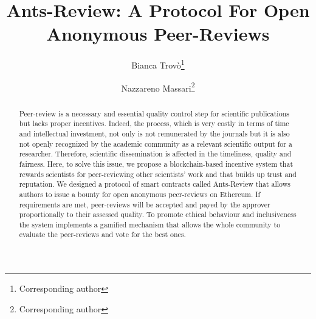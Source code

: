 \documentclass[runningheads]{llncs}
\begin{document}
%
\title{Ants-Review: A Protocol For Open Anonymous Peer-Reviews}
%
%
\author{Bianca Trovò\thanks{Corresponding author}\and
Nazzareno Massari\thanks{Corresponding author}}
%
%
%
\maketitle              %
%
\begin{abstract}
Peer-review is a necessary and essential quality control step for scientific publications but lacks proper  incentives. Indeed, the process, which is very costly in terms of time and intellectual investment, not only is not remunerated by the journals but it is also not openly recognized by the academic community as a relevant scientific output for a researcher. Therefore, scientific dissemination is affected in the timeliness, quality and fairness. Here, to solve this issue, we propose a blockchain-based incentive system that rewards scientists for peer-reviewing other scientists’ work and that builds up trust and reputation. We designed a protocol of smart contracts called Ants-Review that allows authors to issue a bounty for open anonymous peer-reviews on Ethereum. If requirements are met, peer-reviews will be accepted and payed by the approver proportionally to their assessed quality. To promote ethical behaviour and inclusiveness the system implements a gamified mechanism that allows the whole community to evaluate the peer-reviews and vote for the best ones.
\end{abstract}
%
%
\end{document}
